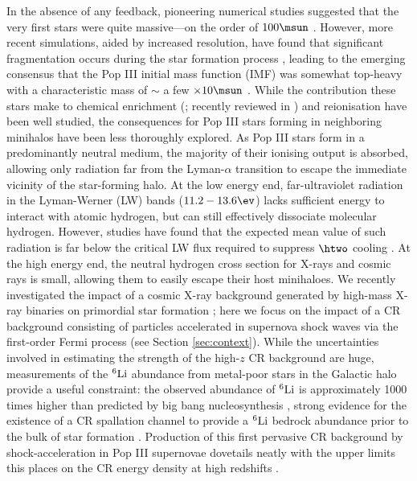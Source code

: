 In the absence of any feedback, pioneering numerical studies suggested that the very first stars were quite massive---on the order of $100\msun$ \citep[e.g.,][]{BrommCoppiLarson1999, BrommCoppiLarson2002, AbelBryanNorman2002, Yoshidaetal2003, BrommLarson2004, Yoshidaetal2006, O'SheaNorman2007}. However, more recent simulations, aided by increased resolution, have found that significant fragmentation occurs during the star formation process \citep{StacyGreifBromm2010,Clarketal2011a,Clarketal2011b,Greifetal2011,Greifetal2012,StacyBromm2013,Hiranoetal2014}, leading to the emerging consensus that the Pop III initial mass function (IMF) was somewhat top-heavy with a characteristic mass of $\sim$ a few $\times 10\msun$ \citep{Bromm2013}. While the contribution these stars make to chemical enrichment (\citealt{MadauFerraraRees2001,MoriFerraraMadau2002,BrommYoshidaHernquist2003,Hegeretal2003,UmedaNomoto2003,TornatoreFerraraSchneider2007,Greifetal2007,Greifetal2010,WiseAbel2008,Maioetal2011}; recently reviewed in \citealt{KarlssonBrommHawthorn2013}) and  reionisation \citep{Kitayamaetal2004,Sokasianetal2004,WhalenAbelNorman2004,AlvarezBrommShapiro2006,JohnsonGreifBromm2007,Robertsonetal2010} have been well studied, the consequences for Pop III stars forming in neighboring minihalos have been less thoroughly explored.  As Pop III stars form in a predominantly neutral medium, the majority of their ionising output is absorbed, allowing only radiation far from the Lyman-$\alpha$ transition to escape the immediate vicinity of the star-forming halo.  At the low energy end, far-ultraviolet radiation in the Lyman-Werner (LW) bands ($11.2 - 13.6\ev$) lacks sufficient energy to interact with atomic hydrogen, but can still effectively dissociate molecular hydrogen.  However, studies have found that the expected mean value of such radiation is far below the critical LW flux required to suppress $\htwo$ cooling \citep{Dijkstraetal2008}. At the high energy end, the neutral hydrogen cross section for X-rays and cosmic rays is small, allowing them to easily escape their host minihaloes. We recently investigated the impact of a cosmic X-ray background generated by high-mass X-ray binaries on primordial star formation \citep{Hummeletal2015}; here we focus on the impact of a CR background consisting of particles accelerated in supernova shock waves via the first-order Fermi process (see Section \ref{sec:context}).  
While the uncertainties involved in estimating the strength of the high-$z$  CR background are huge,  measurements of the $^6{\rm Li}$ abundance from metal-poor stars in the Galactic halo provide a useful constraint: the observed abundance of  $^6{\rm Li}$ is approximately 1000 times higher than predicted by big bang nucleosynthesis \citep{Asplundetal2006}, strong evidence for the existence of a CR spallation channel to provide a $^6{\rm Li}$ bedrock abundance prior to the bulk of star formation \citep{RollindeVangioniOlive2005,RollindeVangioniOlive2006}. Production of this first pervasive CR background by shock-acceleration in Pop III supernovae dovetails neatly with the upper limits this places on the CR energy density at high redshifts \citep{RollindeVangioniOlive2006}.

